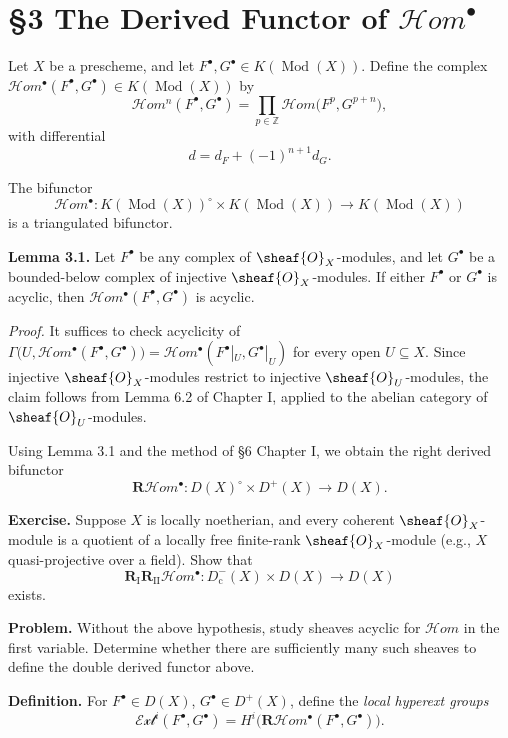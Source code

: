\setcounter{page}{90}
\section{\S3 The Derived Functor of $\boldsymbol{\mathcal{H}\textit{om}}^\bullet$}

Let $X$ be a prescheme, and let $F^\bullet,G^\bullet\in K(\operatorname{Mod}(X))$.
Define the complex $\mathcal{H}\textit{om}^\bullet(F^\bullet,G^\bullet)\in K(\operatorname{Mod}(X))$ by
\[
\mathcal{H}\textit{om}^n(F^\bullet,G^\bullet)
= \prod_{p\in\mathbb{Z}} \mathcal{H}\textit{om}\big(F^p,G^{p+n}\big),
\]
with differential
\[
d = d_F + (-1)^{n+1}d_G.
\]

The bifunctor
\[
\mathcal{H}\textit{om}^\bullet\colon K(\operatorname{Mod}(X))^\circ \times K(\operatorname{Mod}(X))
\to K(\operatorname{Mod}(X))
\]
is a triangulated bifunctor.

\textbf{Lemma 3.1.}
Let $F^\bullet$ be any complex of $\sheaf{O}_X$-modules, and let $G^\bullet$ be a bounded-below complex of injective $\sheaf{O}_X$-modules. If either $F^\bullet$ or $G^\bullet$ is acyclic, then $\mathcal{H}\textit{om}^\bullet(F^\bullet,G^\bullet)$ is acyclic.

\textit{Proof.}
It suffices to check acyclicity of
$\Gamma\big(U,\mathcal{H}\textit{om}^\bullet(F^\bullet,G^\bullet)\big)
= \mathcal{H}\textit{om}^\bullet(F^\bullet|_U,G^\bullet|_U)$
for every open $U\subseteq X$.
Since injective $\sheaf{O}_X$-modules restrict to injective $\sheaf{O}_U$-modules,
the claim follows from Lemma 6.2 of Chapter I, applied to the abelian category of $\sheaf{O}_U$-modules.

\setcounter{page}{91}
Using Lemma 3.1 and the method of \S6 Chapter I, we obtain the right derived bifunctor
\[
\mathbf{R}\mathcal{H}\textit{om}^\bullet\colon D(X)^\circ \times D^+(X) \to D(X).
\]

\textbf{Exercise.}
Suppose $X$ is locally noetherian, and every coherent $\sheaf{O}_X$-module is a quotient of a locally free finite-rank $\sheaf{O}_X$-module (e.g., $X$ quasi-projective over a field).
Show that
\[
\mathbf{R}_\mathrm{I}\mathbf{R}_\mathrm{II}\mathcal{H}\textit{om}^\bullet
\colon D_\mathrm{c}^-(X)\times D(X)\to D(X)
\]
exists.

\textbf{Problem.}
Without the above hypothesis, study sheaves acyclic for $\mathcal{H}\textit{om}$ in the first variable. Determine whether there are sufficiently many such sheaves to define the double derived functor above.

\textbf{Definition.}
For $F^\bullet\in D(X)$, $G^\bullet\in D^+(X)$, define the \textit{local hyperext groups}
\[
\mathcal{Ext}^i(F^\bullet,G^\bullet)
= H^i\big(\mathbf{R}\mathcal{H}\textit{om}^\bullet(F^\bullet,G^\bullet)\big).
\]

